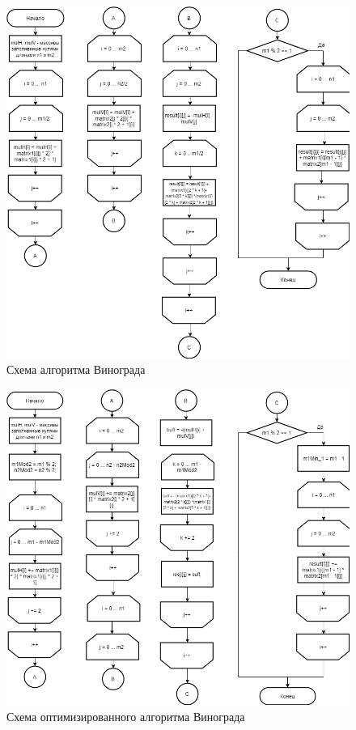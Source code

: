 \documentclass[12pt]{report}
\begin{document}
\begin{figure}[!htbp]
\centering
\includegraphics[scale=0.6]{SchemeVin}
\caption{Схема алгоритма Винограда}
\label{fig:mpr}
\end{figure}


\begin{figure}[!htbp]
\centering
\includegraphics[scale=0.6]{SchemeVinOpt}
\caption{Схема оптимизированного алгоритма Винограда}
\label{fig:mpr}
\end{figure}
\end{document}

